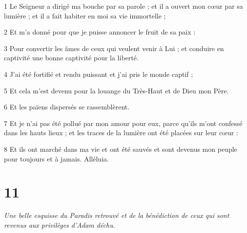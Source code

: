 \par 1 Le Seigneur a dirigé ma bouche par sa parole ; et il a ouvert mon cœur par sa lumière ; et il a fait habiter en moi sa vie immortelle ;
\par 2 Et m'a donné pour que je puisse annoncer le fruit de sa paix :
\par 3 Pour convertir les âmes de ceux qui veulent venir à Lui ; et conduire en captivité une bonne captivité pour la liberté.
\par 4 J'ai été fortifié et rendu puissant et j'ai pris le monde captif ;
\par 5 Et cela m'est devenu pour la louange du Très-Haut et de Dieu mon Père.
\par 6 Et les païens dispersés se rassemblèrent.
\par 7 Et je n'ai pas été pollué par mon amour pour eux, parce qu'ils m'ont confessé dans les hauts lieux ; et les traces de la lumière ont été placées sur leur cœur :
\par 8 Et ils ont marché dans ma vie et ont été sauvés et sont devenus mon peuple pour toujours et à jamais. Alléluia.

\chapter{11}

\par \textit{Une belle esquisse du Paradis retrouvé et de la bénédiction de ceux qui sont revenus aux privilèges d'Adam déchu.}

